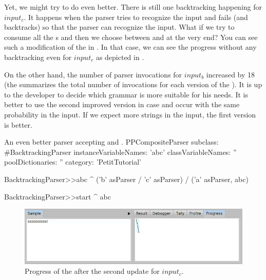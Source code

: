 \documentclass[a4paper,10pt,twoside]{book}
\begin{document}
Yet, we might try to do even better.
There is still one backtracking happening for $input_c$.
It happens when the parser  tries to recognize the  input and fails (and backtracks) so that the parser  can recognize the  input.
What if we try to consume all the s and then we choose between  and  at the very end?
You can see such a modification of the  in .
In that case, we can see the progress without any backtracking even for $input_c$ as depicted in .

On the other hand, the number of parser invocations for $input_b$ increased by 18 (the  summarizes the total number of invocations for each version of the ).
It is up to the developer to decide which grammar is more suitable for his needs.
It is better to use the second improved version in case  and  occur with the same probability in the input.
If we expect more  strings in the input, the first version is better.

\begin{script}{An even better parser accepting  and . \label{scr:pp/backtrackingParser-update-2}}
PPCompositeParser subclass: #BacktrackingParser
	instanceVariableNames: 'abc'
	classVariableNames: ''
	poolDictionaries: ''
	category: 'PetitTutorial'

BacktrackingParser>>abc
  ^  ('b' asParser / 'c' asParser) /
     ('a' asParser, abc)

BacktrackingParser>>start
  ^ abc
\end{script}


\begin{figure}
  \begin{center}
    \includegraphics[width=\linewidth]{example-progressAaac-update-2}
    \caption{Progress of the  after the second update for $input_c$. \label{fig:pp/example-progressAaac-update-2}}
  \end{center}
\end{figure}
\end{document}
